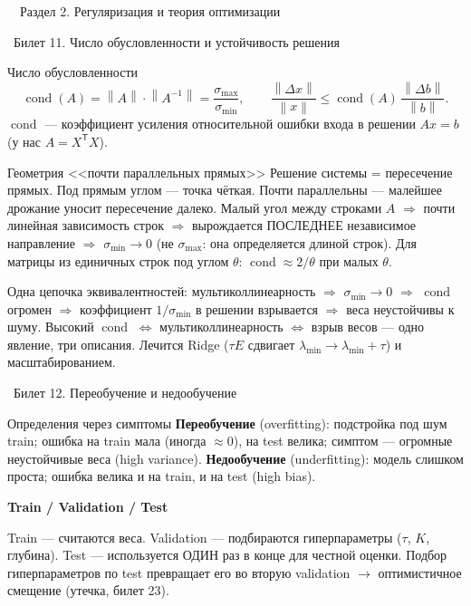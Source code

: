 \documentclass[12pt, a4paper]{article}
\newcommand{\razdel}[2]{%
  \clearpage%
  \noindent\colorbox{razdelcol}{\parbox{\dimexpr\linewidth-2\fboxsep\relax}{%
    \color{white}\LARGE\bfseries\strut\ \ Раздел #1. #2%
  }}%
  \vspace{10pt}%
}
\newcommand{\bilet}[2]{%
  \vspace{10pt}%
  \noindent\colorbox{qcolor}{\parbox{\dimexpr\linewidth-2\fboxsep\relax}{%
    \color{white}\large\bfseries\strut\ Билет #1. #2%
  }}%
  \nopagebreak\vspace{5pt}\par\nopagebreak%
}
\newcommand{\qsub}[1]{%
  \vspace{5pt}%
  {\bfseries\color{defblue} #1}%
  \par\vspace{2pt}%
}
\newcommand{\cond}{\operatorname{cond}}
\newcommand{\tr}{^{\mathsf{T}}}
\newcommand{\norm}[1]{\left\lVert #1 \right\rVert}
\begin{document}
\razdel{2}{Регуляризация и теория оптимизации}

\bilet{11}{Число обусловленности и устойчивость решения}

\begin{defbox}{Число обусловленности}
\[
  \cond(A) = \norm{A}\cdot\norm{A^{-1}} = \frac{\sigma_{\max}}{\sigma_{\min}}, \qquad \frac{\norm{\Delta x}}{\norm{x}} \le \cond(A)\,\frac{\norm{\Delta b}}{\norm{b}}.
\]
$\cond$ --- коэффициент усиления относительной ошибки входа в решении $Ax = b$ (у нас $A = X\tr X$).
\end{defbox}

\begin{propbox}{Геометрия <<почти параллельных прямых>>}
Решение системы = пересечение прямых. Под прямым углом --- точка чёткая. Почти параллельны --- малейшее дрожание уносит пересечение далеко. Малый угол между строками $A$ $\Rightarrow$ почти линейная зависимость строк $\Rightarrow$ вырождается ПОСЛЕДНЕЕ независимое направление $\Rightarrow$ $\sigma_{\min} \to 0$ (не $\sigma_{\max}$: она определяется длиной строк). Для матрицы из единичных строк под углом $\theta$: $\cond \approx 2/\theta$ при малых $\theta$.
\end{propbox}

\begin{fishkabox}
Одна цепочка эквивалентностей: мультиколлинеарность $\Rightarrow$ $\sigma_{\min} \to 0$ $\Rightarrow$ $\cond$ огромен $\Rightarrow$ коэффициент $1/\sigma_{\min}$ в решении взрывается $\Rightarrow$ веса неустойчивы к шуму. Высокий $\cond$ $\Leftrightarrow$ мультиколлинеарность $\Leftrightarrow$ взрыв весов --- одно явление, три описания. Лечится Ridge ($\tau E$ сдвигает $\lambda_{\min} \to \lambda_{\min}+\tau$) и масштабированием.
\end{fishkabox}

\bilet{12}{Переобучение и недообучение}

\begin{defbox}{Определения через симптомы}
\textbf{Переобучение} (overfitting): подстройка под шум train; ошибка на train мала (иногда $\approx 0$), на test велика; симптом --- огромные неустойчивые веса (high variance). \textbf{Недообучение} (underfitting): модель слишком проста; ошибка велика и на train, и на test (high bias).
\end{defbox}

\qsub{Train / Validation / Test}
Train --- считаются веса. Validation --- подбираются гиперпараметры ($\tau$, $K$, глубина). Test --- используется ОДИН раз в конце для честной оценки. Подбор гиперпараметров по test превращает его во вторую validation $\to$ оптимистичное смещение (утечка, билет 23).
\end{document}
